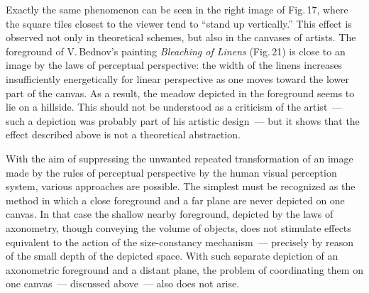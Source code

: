 
Exactly the same phenomenon can be seen in the right image of Fig.\,17, where the
square tiles closest to the viewer tend to ``stand up vertically.''  This effect is observed
not only in theoretical schemes, but also in the canvases of artists.  The foreground of
V.\,Bednov's painting \emph{Bleaching of Linens} (Fig.\,21) is close to an image by
the laws of perceptual perspective: the width of the linens increases insufficiently
energetically for linear perspective as one moves toward the lower part of the canvas.
As a result, the meadow depicted in the foreground seems to lie on a hillside.  This
should not be understood as a criticism of the artist~--- such a depiction was probably
part of his artistic design~--- but it shows that the effect described above is not a
theoretical abstraction.



With the aim of suppressing the unwanted repeated transformation of an image made by
the rules of perceptual perspective by the human visual perception system, various
approaches are possible.  The simplest must be recognized as the method in which a
close foreground and a far plane are never depicted on one canvas.  In that case the
shallow nearby foreground, depicted by the laws of axonometry, though conveying the
volume of objects, does not stimulate effects equivalent to the action of the size-constancy
mechanism~--- precisely by reason of the small depth of the depicted space.  With such
separate depiction of an axonometric foreground and a distant plane, the problem of
coordinating them on one canvas~--- discussed above~--- also does not arise.

